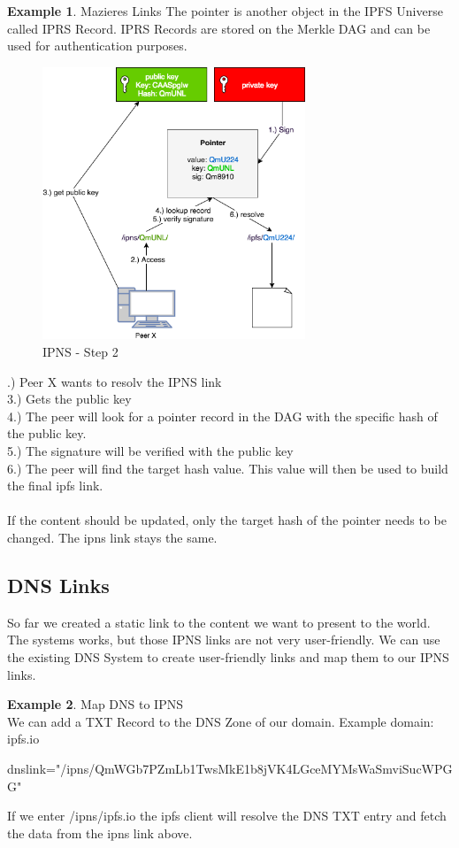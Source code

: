 \documentclass[a4paper,11pt, oneside]{report}
\theoremstyle{definition}
\newtheorem{exmp}{Example}[subsection]
\begin{document}
\begin{exmp}{Mazieres Links}
The pointer is another object in the IPFS Universe called IPRS Record. IPRS Records are stored on the Merkle DAG and can be used for authentication purposes.
\begin{figure}[H]
\centering
\includegraphics[width=0.7\textwidth]{img/ipns-2.png}
\caption[IPNS Step 2]{IPNS - Step 2}
\end{figure}
.) Peer X wants to resolv the IPNS link\\
3.) Gets the public key\\
4.) The peer will look for a pointer record in the DAG with the specific hash of the public key. \\
5.) The signature will be verified with the public key\\
6.) The peer will find the target hash value. This value will then be used to build the final ipfs link. \\ \\
If the content should be updated, only the target hash of the pointer needs to be changed. The ipns link stays the same.


\end{exmp}

\newpage
\subsection{DNS Links}
So far we created a static link to the content we want to present to the world. The systems works, but those IPNS links are not very user-friendly. We can use the existing DNS System to create user-friendly links and map them to our IPNS links.\\
\begin{exmp} Map DNS to IPNS\\
We can add a TXT Record to the DNS Zone of our domain. Example domain: ipfs.io \cite{DNS}
\begin{center}
	dnslink="/ipns/QmWGb7PZmLb1TwsMkE1b8jVK4LGceMYMsWaSmviSucWPGG"
\end{center}
If we enter /ipns/ipfs.io the ipfs client will resolve the DNS TXT  entry and fetch the data from the ipns link above.
\end{exmp}
\end{document}
